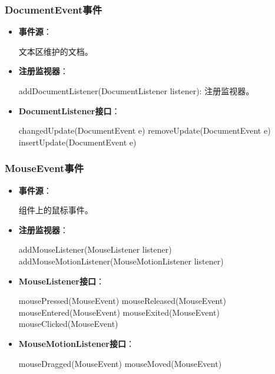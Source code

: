 \documentclass[a4paper, 10pt]{ctexart}
\begin{document}
\subsubsection{DocumentEvent事件}
\begin{itemize}
  \item \textbf{事件源}：
  \begin{codeblock}
文本区维护的文档。
  \end{codeblock}
  \item \textbf{注册监视器}：
  \begin{codeblock}
addDocumentListener(DocumentListener listener): 注册监视器。
  \end{codeblock}
  \item \textbf{DocumentListener接口}：
  \begin{codeblock}
changedUpdate(DocumentEvent e)
removeUpdate(DocumentEvent e)
insertUpdate(DocumentEvent e)
  \end{codeblock}
\end{itemize}

\subsubsection{MouseEvent事件}
\begin{itemize}
  \item \textbf{事件源}：
  \begin{codeblock}
组件上的鼠标事件。
  \end{codeblock}
  \item \textbf{注册监视器}：
  \begin{codeblock}
addMouseListener(MouseListener listener)
addMouseMotionListener(MouseMotionListener listener)
  \end{codeblock}
  \item \textbf{MouseListener接口}：
  \begin{codeblock}
mousePressed(MouseEvent)
mouseReleased(MouseEvent)
mouseEntered(MouseEvent)
mouseExited(MouseEvent)
mouseClicked(MouseEvent)
  \end{codeblock}
  \item \textbf{MouseMotionListener接口}：
  \begin{codeblock}
mouseDragged(MouseEvent)
mouseMoved(MouseEvent)
  \end{codeblock}
\end{itemize}
\end{document}
